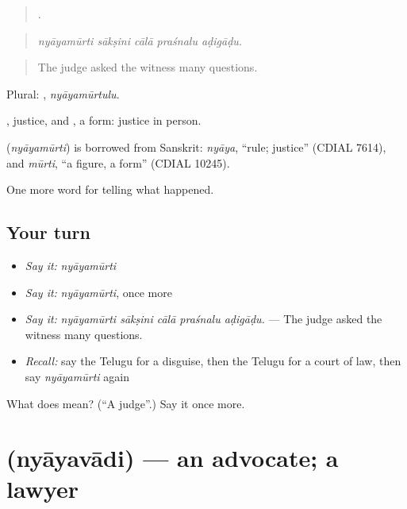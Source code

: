 \begin{quote}
    .
\end{quote}

\begin{quote}
\emph{nyāyamūrti sākṣini cālā praśnalu aḍigāḍu.}
\end{quote}

\begin{quote}
The judge asked the witness many questions.
\end{quote}

Plural: , \emph{nyāyamūrtulu}.

, justice, and , a form: justice in person.

\begin{cousinweb}
\textbf{} (\emph{nyāyamūrti}) is borrowed from Sanskrit: \emph{nyāya}, \textquotedblleft{}rule; justice\textquotedblright{} (CDIAL 7614), and \emph{mūrti}, \textquotedblleft{}a figure, a form\textquotedblright{} (CDIAL 10245).
\end{cousinweb}

\begin{grammarlens}[title={What you've built}]
One more word for telling what happened.
\end{grammarlens}

\subsection*{Your turn}
\begin{itemize}
\raggedright
  \item \emph{Say it:} \emph{nyāyamūrti}
  \item \emph{Say it:} \emph{nyāyamūrti}, once more
  \item \emph{Say it:} \emph{nyāyamūrti sākṣini cālā praśnalu aḍigāḍu.} — The judge asked the witness many questions.
  \item \emph{Recall:} say the Telugu for a disguise, then the Telugu for a court of law, then say \emph{nyāyamūrti} again
\end{itemize}

\begin{tcolorbox}[breakable,colback=teal!4,colframe=teal!35!black,title={Before you move on}]
What does  mean? (\textquotedblleft{}A judge\textquotedblright{}.) Say it once more.
\end{tcolorbox}
\section[\texorpdfstring{\te{న్యాయవాది} (nyāyavādi)}{న్యాయవాది (nyāyavādi)}]{ (nyāyavādi) — an advocate; a lawyer}

